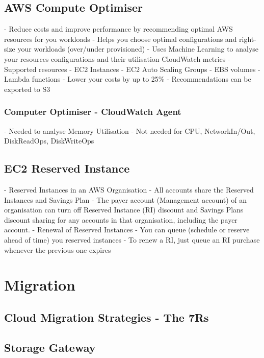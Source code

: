 \documentclass[11pt]{book}
\begin{document}


    \section{AWS Compute Optimiser}
    - Reduce costs and improve performance by recommending optimal AWS resources for you workloads
    - Helps you choose optimal configurations and right-size your workloads (over/under provisioned)
    - Uses Machine Learning to analyse your resources configurations and their utilisation CloudWatch metrics
    - Supported resources
    - EC2 Instances
    - EC2 Auto Scaling Groups
    - EBS volumes
    - Lambda functions
    - Lower your costs by up to 25\%
    - Recommendations can be exported to S3

    \subsection{Computer Optimiser - CloudWatch Agent}
    - Needed to analyse Memory Utilisation
    - Not needed for CPU, NetworkIn/Out, DiskReadOps, DiskWriteOps


    \section{EC2 Reserved Instance}
    - Reserved Instances in an AWS Organisation
    - All accounts share the Reserved Instances and Savings Plan
    - The payer account (Management account) of an organisation can turn off Reserved Instance (RI) discount and Savings Plans discount sharing for any accounts in that organisation, including the payer account.
    - Renewal of Reserved Instances
    - You can queue (schedule or reserve ahead of time) you reserved instances
    - To renew a RI, just queue an RI purchase whenever the previous one expires


    \chapter{Migration}


    \section{Cloud Migration Strategies - The 7Rs}


    \section{Storage Gateway}
\end{document}

